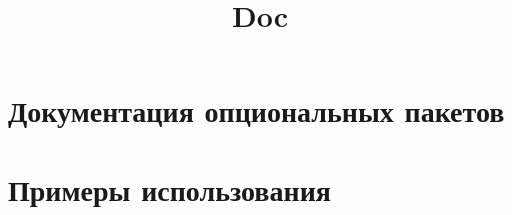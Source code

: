 \documentclass{../stvuz_khpi}
\title{Doc}%
\begin{document}



\tableofcontents
\newpage
\pagestyle{myheadings}

\section{Документация опциональных пакетов}

\section{Примеры использования}

\end{document}
